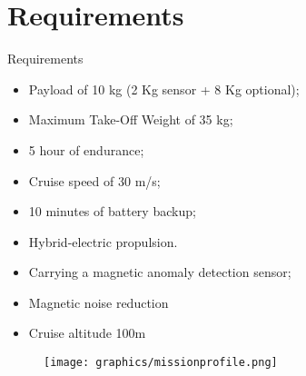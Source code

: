 \begin{comment}
Slide 1 - Project Title and Group Composition - check
Slide 2 - Design Requirements Summary from the RFP
Slide 3 - Market Analysis
Slide 4 - Concept Generation
Slide 5 - Concept Selection
Slide 6-8 - MTOW, VTOL requirements.. rotor design, design points.
Slide 9 - Rotor Design
Slide 10-11 - Wing Design/Tail Design (if applicable)
prop
Slide 12-13 - Magnetic characterization  or  Heavy Lift (Payload design)
Slide 14 - Avionics Systems
Slide 15 - CAD model
Slide 16 - Summary of tasks completed +  Tasks that still needs to be completed
\end{comment}
\section{Requirements}

\begin{frame}{Requirements}
    \begin{itemize}
        \item Payload of 10 kg (2 Kg sensor + 8 Kg optional);
        \item Maximum Take-Off Weight of 35 kg;
        \item 5 hour of endurance;
        \item Cruise speed of 30 m/s;
        \item 10 minutes of battery backup;
        \item Hybrid-electric propulsion.
        \item Carrying a magnetic anomaly detection sensor;
        \item Magnetic noise reduction
        \item Cruise altitude 100m
    \end{itemize}
    
    \begin{figure}
        \texttt{[image: graphics/missionprofile.png]}
    \end{figure} 
    
\end{frame}

